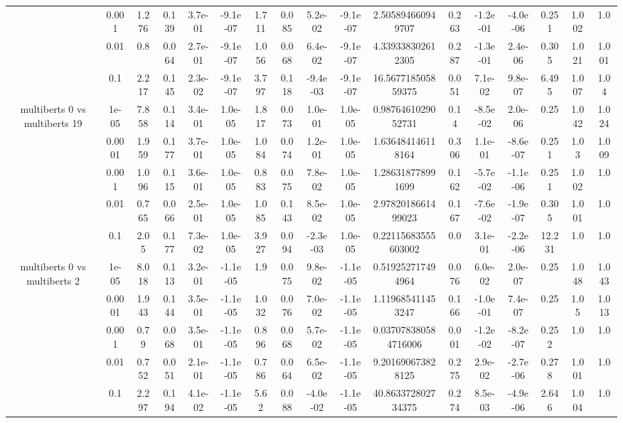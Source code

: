 \begin{tabular}{|c|c|c|c|c|c|c|c|c|c|c|c|c|c|c|c|c|}
 & 0.001 & 1.276 & 0.139 & 3.7e-01 & -9.1e-07 & 1.711 & 0.085 & 5.2e-02 & -9.1e-07 & 2.505894660949707 & 0.263 & -1.2e-01 & -4.0e-06 & 0.251 & 1.002 & 1.0 \\
 & 0.01 & 0.8 & 0.064 & 2.7e-01 & -9.1e-07 & 1.056 & 0.068 & 6.4e-02 & -9.1e-07 & 4.339338302612305 & 0.287 & -1.3e-01 & 2.4e-06 & 0.305 & 1.021 & 1.001 \\
 & 0.1 & 2.217 & 0.145 & 2.3e-02 & -9.1e-07 & 3.797 & 0.118 & -9.4e-03 & -9.1e-07 & 16.567718505859375 & 0.051 & 7.1e-02 & 9.8e-07 & 6.495 & 1.007 & 1.04 \\
\hline
\multirow{5}{*}{multiberts 0 vs multiberts 19} & 1e-05 & 7.858 & 0.114 & 3.4e-01 & 1.0e-05 & 1.817 & 0.073 & 1.0e-01 & 1.0e-05 & 0.9876461029052731 & 0.14 & -8.5e-02 & 2.0e-06 & 0.25 & 1.042 & 1.024 \\
 & 0.0001 & 1.959 & 0.177 & 3.7e-01 & 1.0e-05 & 1.084 & 0.074 & 1.2e-01 & 1.0e-05 & 1.636484146118164 & 0.306 & 1.1e-01 & -8.6e-07 & 0.251 & 1.03 & 1.009 \\
 & 0.001 & 1.096 & 0.115 & 3.6e-01 & 1.0e-05 & 0.883 & 0.075 & 7.8e-02 & 1.0e-05 & 1.286318778991699 & 0.162 & -5.7e-02 & -1.1e-06 & 0.251 & 1.002 & 1.0 \\
 & 0.01 & 0.765 & 0.066 & 2.5e-01 & 1.0e-05 & 1.085 & 0.143 & 8.5e-02 & 1.0e-05 & 2.9782018661499023 & 0.167 & -7.6e-02 & -1.9e-07 & 0.305 & 1.001 & 1.0 \\
 & 0.1 & 2.05 & 0.177 & 7.3e-02 & 1.0e-05 & 3.927 & 0.094 & -2.3e-03 & 1.0e-05 & 0.22115683555603002 & 0.0 & 3.1e-01 & -2.2e-06 & 12.231 & 1.0 & 1.0 \\
\hline
\multirow{5}{*}{multiberts 0 vs multiberts 2} & 1e-05 & 8.018 & 0.113 & 3.2e-01 & -1.1e-05 & 1.9 & 0.075 & 9.8e-02 & -1.1e-05 & 0.519252717494964 & 0.076 & 6.0e-02 & 2.0e-07 & 0.25 & 1.048 & 1.043 \\
 & 0.0001 & 1.943 & 0.144 & 3.5e-01 & -1.1e-05 & 1.032 & 0.076 & 7.0e-02 & -1.1e-05 & 1.119685411453247 & 0.166 & -1.0e-01 & 7.4e-07 & 0.25 & 1.05 & 1.013 \\
 & 0.001 & 0.79 & 0.068 & 3.5e-01 & -1.1e-05 & 0.896 & 0.068 & 5.7e-02 & -1.1e-05 & 0.037078380584716006 & 0.001 & -1.2e-02 & -8.2e-07 & 0.252 & 1.0 & 1.0 \\
 & 0.01 & 0.752 & 0.051 & 2.1e-01 & -1.1e-05 & 0.786 & 0.064 & 6.5e-02 & -1.1e-05 & 9.201690673828125 & 0.275 & 2.9e-02 & -2.7e-06 & 0.278 & 1.001 & 1.0 \\
 & 0.1 & 2.297 & 0.194 & 4.1e-02 & -1.1e-05 & 5.62 & 0.088 & -4.0e-02 & -1.1e-05 & 40.863372802734375 & 0.274 & 8.5e-03 & -4.9e-06 & 2.646 & 1.004 & 1.0 \\

\end{tabular}
